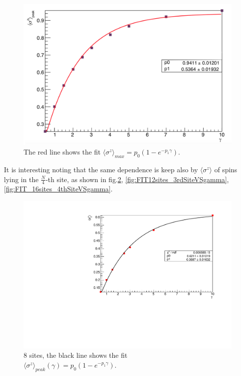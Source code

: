 \begin{figure}[H]
    \centering
    \includegraphics[scale=0.5]{Figures/FIT_PeakLMVsGamma.png}
    \caption{The red line shows the fit $\langle\sigma^z\rangle_{max} = p_0(1-e^{-p_1\gamma})$.}
    \label{fig:FIT_PeakLMvsGamma_J1051}
\end{figure}

It is interesting noting that the same dependence is keep also by $\langle\sigma^z\rangle$ of spins lying in the $\frac{N}{4}$-th site, as shown in fig.\ref{fig:FIT8sites_LM_2ndSiteVSgamma}, \ref{fig:FIT12sites_3rdSiteVSgamma}, \ref{fig:FIT_16sites_4thSiteVSgamma}.

\begin{figure}[H]
    \centering
    \includegraphics[scale=0.7]{Figures/8sites/FIT_8sites_2ndLMvsGamma.pdf}
    \caption{8 sites, the black line shows the fit \\$\langle\sigma^z\rangle_{peak}(\gamma) = p_0(1-e^{-p_1\gamma})$.}
    \label{fig:FIT8sites_LM_2ndSiteVSgamma}
\end{figure}

